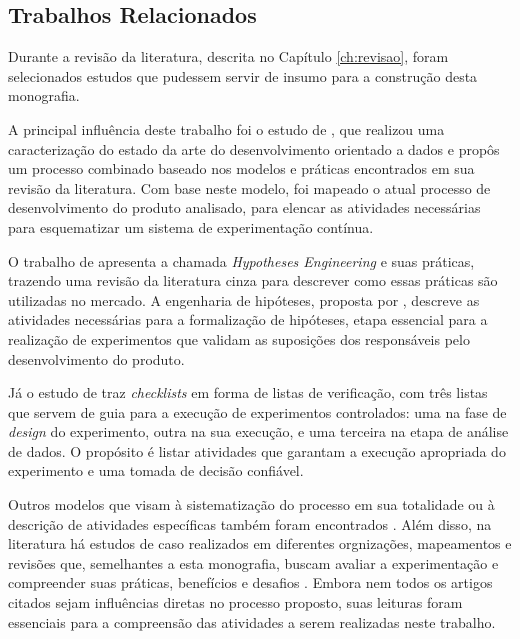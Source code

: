 \subsection{Trabalhos Relacionados}
\label{subsec:relacionados}

Durante a revisão da literatura, descrita no Capítulo \ref{ch:revisao}, foram selecionados estudos que pudessem servir de insumo para a construção desta monografia.

A principal influência deste trabalho foi o estudo de , que realizou uma caracterização do estado da arte do desenvolvimento orientado a dados e propôs um processo combinado baseado nos modelos e práticas encontrados em sua revisão da literatura. Com base neste modelo, foi mapeado o atual processo de desenvolvimento do produto analisado, para elencar as atividades necessárias para esquematizar um sistema de experimentação contínua.

O trabalho de  apresenta a chamada \textit{Hypotheses Engineering} e suas práticas, trazendo uma revisão da literatura cinza para descrever como essas práticas são utilizadas no mercado. A engenharia de hipóteses, proposta por , descreve as atividades necessárias para a formalização de hipóteses, etapa essencial para a realização de experimentos que validam as suposições dos responsáveis pelo desenvolvimento do produto.

Já o estudo de  traz \textit{checklists} em forma de listas de verificação, com três listas que servem de guia para a execução de experimentos controlados: uma na fase de \textit{design} do experimento, outra na sua execução, e uma terceira na etapa de análise de dados. O propósito é listar atividades que garantam a execução apropriada do experimento e uma tomada de decisão confiável.

Outros modelos que visam à sistematização do processo em sua totalidade ou à descrição de atividades específicas também foram encontrados \cite{fagerholm_right_2017, issa_mattos_hurrier_2023, olsson_opinions_2014}. Além disso, na literatura há estudos de caso realizados em diferentes orgnizações, mapeamentos e revisões que, semelhantes a esta monografia, buscam avaliar a experimentação e compreender suas práticas, benefícios e desafios \cite{kevic_characterizing_2017, kuhrmann_activity_2018, fernandes_hitting_2015, sauvola_towards_2015, issa_mattos_hurrier_2023, kohavi_online_2013, fabijan_benefits_2017, quin_b_2024, erthal_characterization_2023, larsen_statistical_2024}. Embora nem todos os artigos citados sejam influências diretas no processo proposto, suas leituras foram essenciais para a compreensão das atividades a serem realizadas neste trabalho.


